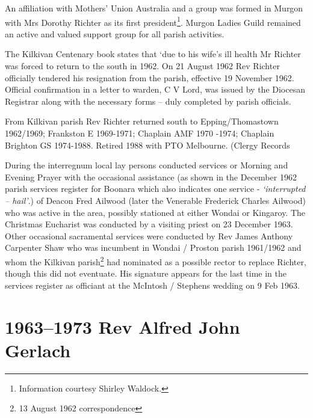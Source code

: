 An affiliation with Mothers' Union Australia and a group was formed in Murgon with Mrs Dorothy Richter as its first president\footnote{Information courtesy Shirley Waldock.}. Murgon Ladies Guild remained an active and valued support group for all parish activities.


The Kilkivan Centenary book states that `due to his wife's ill health Mr Richter was forced to return to the south in 1962. On 21 August 1962 Rev Richter officially tendered his resignation from the parish, effective 19 November 1962. Official confirmation in a letter to warden, C V Lord, was issued by the Diocesan Registrar along with the necessary forms -- duly completed by parish officials.



From Kilkivan parish Rev Richter returned south to Epping/Thomastown 1962/1969; Frankston E 1969-1971; Chaplain AMF 1970 -1974; Chaplain Brighton GS 1974-1988. Retired 1988 with PTO Melbourne. (Clergy Records



During the interregnum local lay persons conducted services or Morning and Evening Prayer with the occasional assistance (as shown in the December 1962 parish services register for Boonara which also indicates one service - \emph{`interrupted -- hail'}.) of Deacon Fred Ailwood (later the Venerable Frederick Charles Ailwood) who was active in the area, possibly stationed at either Wondai or Kingaroy. The Christmas Eucharist was conducted by a visiting priest on 23 December 1963. Other occasional sacramental services were conducted by Rev James Anthony Carpenter Shaw who was incumbent in Wondai / Proston parish 1961/1962 and whom the Kilkivan parish\footnote{13 August 1962 correspondence} had nominated as a possible rector to replace Richter, though this did not eventuate. His signature appears for the last time in the services register as officiant at the McIntosh / Stephens wedding on 9 Feb 1963.


\balance


\printendnotes[custom]
\setcounter{endnote}{0}
\chapter{1963--1973 Rev Alfred John Gerlach}
\nobalance



